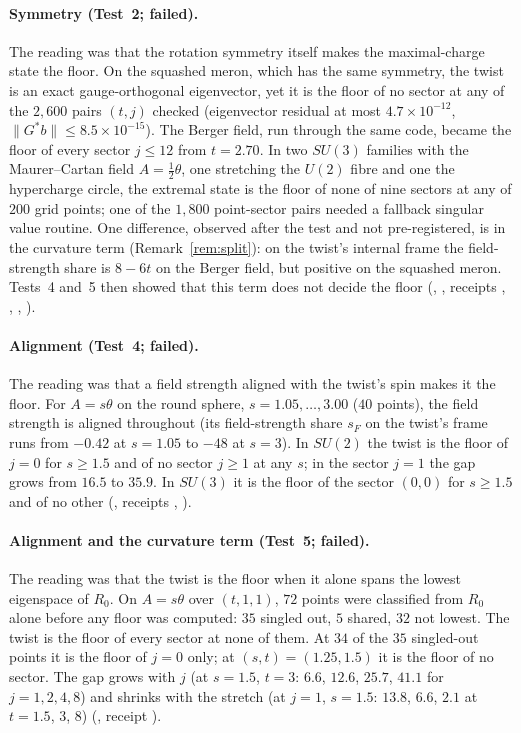 \documentclass[11pt]{article}
\theoremstyle{definition}
\theoremstyle{remark}
\begin{document}
\paragraph{Symmetry (Test~2; failed).} The reading was that the rotation symmetry itself makes the maximal-charge state
the floor. On the squashed meron, which has the same symmetry, the twist is an exact gauge-orthogonal eigenvector, yet it
is the floor of no sector at any of the $2{,}600$ pairs $(t,j)$ checked (eigenvector residual at most
$4.7\times10^{-12}$, $\lVert G^*b\rVert\le8.5\times10^{-15}$). The Berger field, run through the same code, became the
floor of every sector $j\le12$ from $t=2.70$. In two $SU(3)$ families with the Maurer--Cartan field $A=\tfrac12\theta$,
one stretching the $U(2)$ fibre and one the hypercharge circle, the extremal state is the floor of none of nine sectors
at any of $200$ grid points; one of the $1{,}800$ point-sector pairs needed a fallback singular value routine. One
difference, observed after the test and not pre-registered, is in the curvature term (Remark~\ref{rem:split}): on the
twist's internal frame the field-strength share is $8-6t$ on the Berger field, but positive on the squashed meron.
Tests~4 and~5 then showed that this term does not decide the floor (,
, receipts , ,
, ).

\paragraph{Alignment (Test~4; failed).} The reading was that a field strength aligned with the twist's spin makes it the
floor. For $A=s\theta$ on the round sphere, $s=1.05,\dots,3.00$ ($40$ points), the field strength is aligned throughout
(its field-strength share $s_F$ on the twist's frame runs from $-0.42$ at $s=1.05$ to $-48$ at $s=3$). In $SU(2)$ the
twist is the floor of $j=0$ for $s\ge1.5$ and of no sector $j\ge1$ at any $s$; in the sector $j=1$ the gap grows from
$16.5$ to $35.9$. In $SU(3)$ it is the floor of the sector $(0,0)$ for $s\ge1.5$ and of no other
(, receipts , ).

\paragraph{Alignment and the curvature term (Test~5; failed).} The reading was that the twist is the floor when it alone
spans the lowest eigenspace of $R_0$. On $A=s\theta$ over $(t,1,1)$, $72$ points were classified from $R_0$ alone
before any floor was computed: $35$ singled out, $5$ shared, $32$ not lowest. The twist is the floor of every sector at
none of them. At $34$ of the $35$ singled-out points it is the floor of $j=0$ only; at $(s,t)=(1.25,1.5)$ it is the
floor of no sector. The gap grows with $j$ (at $s=1.5$, $t=3$: $6.6$, $12.6$, $25.7$, $41.1$ for $j=1,2,4,8$) and
shrinks with the stretch (at $j=1$, $s=1.5$: $13.8$, $6.6$, $2.1$ at $t=1.5$, $3$, $8$) (,
receipt ).
\end{document}
